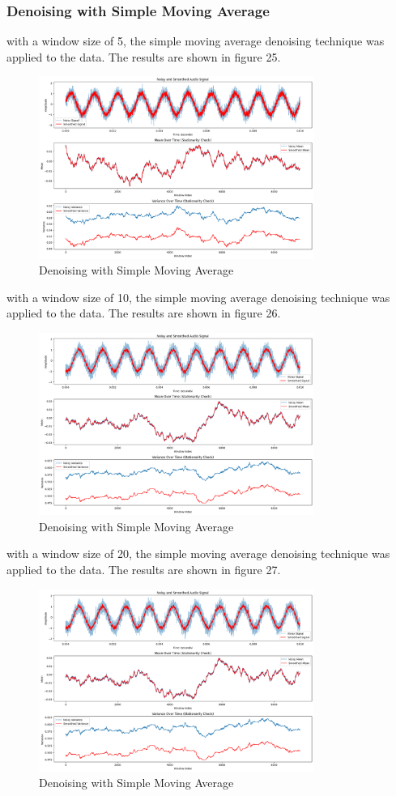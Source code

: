 \documentclass[a4paper,12pt]{article} %
\begin{document}
\subsubsection{ Denoising with Simple Moving Average}
with a window size of 5, the simple moving average denoising technique was applied to the data. The results are shown in figure 25.
\begin{figure}[h]
\centering
\includegraphics[width=0.8\textwidth]{Q3_SMA_5.png}
\caption{Denoising with Simple Moving Average}
\end{figure}
\clearpage
with a window size of 10, the simple moving average denoising technique was applied to the data. The results are shown in figure 26.
\begin{figure}[h]
\centering
\includegraphics[width=0.8\textwidth]{Q3_SMA_10.png}
\caption{Denoising with Simple Moving Average}
\end{figure}
\clearpage
with a window size of 20, the simple moving average denoising technique was applied to the data. The results are shown in figure 27.
\begin{figure}[h]
\centering
\includegraphics[width=0.8\textwidth]{Q3_SMA_20.png}
\caption{Denoising with Simple Moving Average}
\end{figure}
\clearpage
\end{document}
